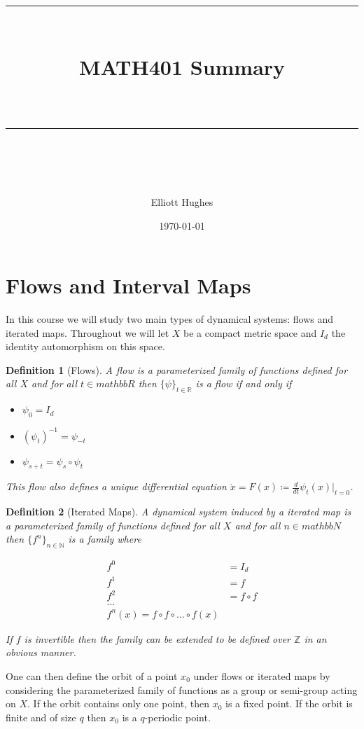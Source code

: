 \documentclass{article}
\title{	
	\normalfont\normalsize 
	\rule{\linewidth}{0.5pt}\\ %
	\vspace{14pt} %
	{\LARGE MATH401 Summary \\ %
    \large \textit{} \\}
	\vspace{6pt} %
	\rule{\linewidth}{1pt}\\ %
}
\author{Elliott Hughes}
\date{\normalsize\today}
\newtheorem{definition}{Definition}
\begin{document}
\maketitle

\section*{Flows and Interval Maps}
In this course we will study two main types of dynamical systems: flows and iterated maps. 
Throughout we will let $X$ be a compact metric space and $I_d$ the identity automorphism 
on this space.

\begin{definition}[Flows]
    A flow is a parameterized family of functions defined for all $X$ and for all $t \in mathbb{R}$ 
    then $\{\psi\}_{t\in\mathbb{R}}$ is a flow if and only if 

    \begin{itemize}
        \item $\psi_0 = I_d$
        \item $(\psi_t)^{-1} = \psi_{-t}$
        \item $\psi_{s+t} = \psi_s \circ \psi_t$
    \end{itemize}

    This flow also defines a unique differential equation \(\dot{x} = F(x) \coloneqq \frac{d}{dt}\psi_t(x)|_{t=0}\).
\end{definition}

\begin{definition}[Iterated Maps]
    A dynamical system induced by a iterated map is a parameterized family of functions defined for all $X$ and for all $n \in mathbb{N}$ 
    then $\{f^n\}_{n \in \mathbb{N}}$ is a family where 
    
    \begin{align*}
        f^0 &= I_d \\
        f^1 &= f \\
        f^2 & = f \circ f \\
        \dots& \\
        f^n(x) = f \circ f \circ \dots \circ f(x)
    \end{align*}

    If $f$ is invertible then the family can be extended to be defined over $\mathbb{Z}$ in an obvious manner.
\end{definition}

One can then define the orbit of a point $x_0$ under flows or iterated maps by considering the parameterized 
family of functions as a group or semi-group acting on $X$. If the orbit contains only one 
point, then $x_0$ is a fixed point. If the orbit is finite and of size $q$ then $x_0$ is a $q$-periodic point. 
\end{document}

